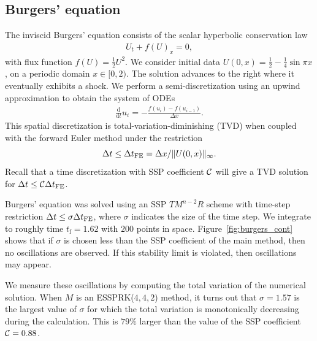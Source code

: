 \subsection{Burgers' equation}\label{subsubsec:burgers}
The inviscid Burgers' equation consists of the scalar hyperbolic conservation law
\begin{align}\label{eq:HCL}
    U_{t} + f(U)_{x} = 0,
\end{align}
with flux function $f(U) = \frac{1}{2}U^{2}$. 
We consider initial data
$U(0,x)  = \frac{1}{2} - \frac{1}{4}\sin{\pi x}$,
on a periodic domain $x \in [0,2)$.
The solution advances to the right where it eventually exhibits a shock. 
We perform a semi-discretization
using an upwind approximation to obtain the system of ODEs
\begin{align*}\label{eq:burgers_flux}
	\frac{\textrm{d}}{\textrm{d} t} u_i = -\frac{f(u_{i}) - f(u_{i-1})}{\Delta x}.
\end{align*}
This spatial discretization is total-variation-diminishing (TVD) when
coupled with the forward Euler method under the restriction
\cite{Laney:1998}  %
$$\Delta t \leq {\Delta t}_{\text{FE}} = \Delta x / \|U(0,x)\|_{\infty}.$$
Recall that a time discretization with SSP
coefficient $\mathcal{C}$ will give a TVD solution for $\Delta t \leq
\mathcal{C} {\Delta t}_{\text{FE}}$.

Burgers' equation was solved using an SSP $TM^{n-2}R$ scheme with time-step
restriction $\Delta t \leq \sigma{\Delta t}_{\text{FE}}$, where $\sigma$ indicates the size 
of the time step. 
We integrate to roughly time $t_\text{f} = 1.62$ with $200$ points in space.
Figure~\ref{fig:burgers_cont} shows that if $\sigma$ is chosen less than the SSP
coefficient of the main method, then no oscillations are observed. 
If this stability limit is violated, then oscillations may appear.

We measure these oscillations by computing the total variation of the 
numerical solution.
When $M$ is an ESSPRK($4,4,2$) method,
it turns out that $\sigma = 1.57$ is the largest value of $\sigma$
for which the total variation is monotonically decreasing during the
calculation.
This is $79\%$ larger than the value of the SSP coefficient $\mathcal{C} = 0.88$.

